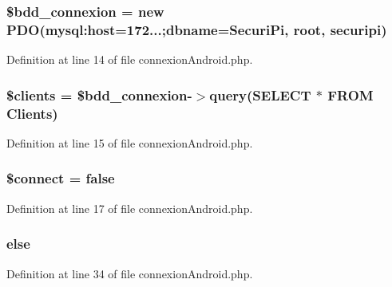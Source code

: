 \subsubsection[{\$bdd\+\_\+connexion}]{\setlength{\rightskip}{0pt plus 5cm}\$bdd\+\_\+connexion = new P\+D\+O(\textquotesingle{}mysql\+:host=172...;dbname=Securi\+Pi\textquotesingle{}, \textquotesingle{}root\textquotesingle{}, \textquotesingle{}securipi\textquotesingle{})}\label{connexion_android_8php_a39288d2beaac5eb46f2fa51066fd5df2}


Definition at line 14 of file connexion\+Android.\+php.

\subsubsection[{\$clients}]{\setlength{\rightskip}{0pt plus 5cm}\$clients = \$bdd\+\_\+connexion-\/$>$query(\textquotesingle{}S\+E\+L\+E\+C\+T $\ast$ F\+R\+O\+M Clients\textquotesingle{})}\label{connexion_android_8php_a3e6b906050bb3d1e3493257491f54f8b}


Definition at line 15 of file connexion\+Android.\+php.

\subsubsection[{\$connect}]{\setlength{\rightskip}{0pt plus 5cm}\$connect = false}\label{connexion_android_8php_a956617395b85e98d907df712f6d0d3f7}


Definition at line 17 of file connexion\+Android.\+php.

\subsubsection[{else}]{\setlength{\rightskip}{0pt plus 5cm}else}\label{connexion_android_8php_a0544c3fe466e421738dae463968b70ba}


Definition at line 34 of file connexion\+Android.\+php.

